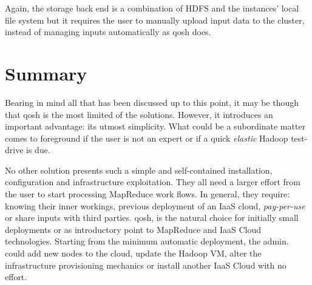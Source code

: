 Again, the storage back end is a combination of HDFS and the instances' local file system but it requires the user to manually upload input data to the cluster, instead of managing inputs automatically as qosh does.

\section{Summary}\label{sec:resumenconclusiones}
\noindent Bearing in mind all that has been discussed up to this point, it may be though that qosh is the most limited of the solutions. However, it introduces an important advantage: its utmost simplicity. What could be a subordinate matter comes to foreground if the user is not an expert or if a quick \emph{elastic} Hadoop test-drive is due.

No other solution presents such a simple and self-contained installation, configuration and infrastructure exploitation. They all need a larger effort from the user to start processing MapReduce work flows. In general, they require: knowing their inner workings, previous deployment of an IaaS cloud, \emph{pay-per-use} or share inputs with third parties. qosh, is the natural choice for initially small deployments or as introductory point to MapReduce and IaaS Cloud technologies. Starting from the minimum automatic deployment, the admin. could add new nodes to the cloud, update the Hadoop VM, alter the infrastructure provisioning mechanics or install another IaaS Cloud with no effort.

